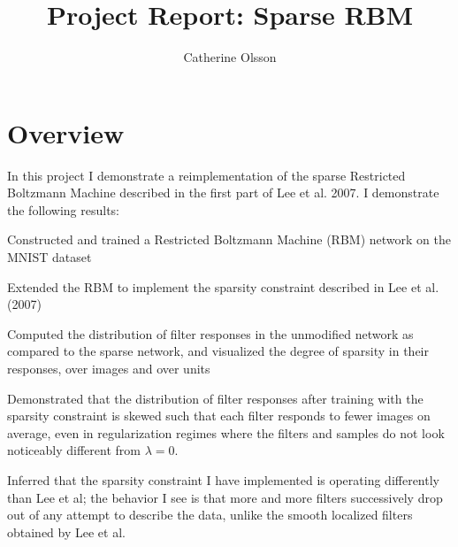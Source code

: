 \documentclass[12pt]{article}
\title{Project Report: Sparse RBM}
\author{Catherine Olsson}
\begin{document}
\maketitle

\section*{Overview}
In this project I demonstrate a reimplementation of the sparse Restricted Boltzmann Machine described in the first part of Lee et al. 2007. I demonstrate the following results:
\\
\begin{compactitem}
\item Constructed and trained a Restricted Boltzmann Machine (RBM) network on the MNIST dataset
\item Extended the RBM to implement the sparsity constraint described in Lee et al. (2007)
\item Computed the distribution of filter responses in the unmodified network as compared to the sparse network, and visualized the degree of sparsity in their responses, over images and over units
\item Demonstrated that the distribution of filter responses after training with the sparsity constraint is skewed such that each filter responds to fewer images on average, even in regularization regimes where the filters and samples do not look noticeably different from $\lambda=0$.
\item Inferred that the sparsity constraint I have implemented is operating differently than Lee et al; the behavior I see is that more and more filters successively drop out of any attempt to describe the data, unlike the smooth localized filters obtained by Lee et al.
\end{compactitem}
\end{document}
